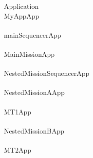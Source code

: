 %
%
\begin{circus}
\circprocess  Application \circdef \\
\circblockopen
MyAppApp\\
\interleave\\
mainSequencerApp\\
\interleave \\
		MainMissionApp\\
		\interleave \\
			NestedMissionSequencerApp\\
			
		
		\interleave \\
		NestedMissionAApp\\
		\interleave \\
			MT1App\\
			
		\interleave \\
		NestedMissionBApp\\
		\interleave \\
			MT2App\\
			
		
\circblockclose
\end{circus}
